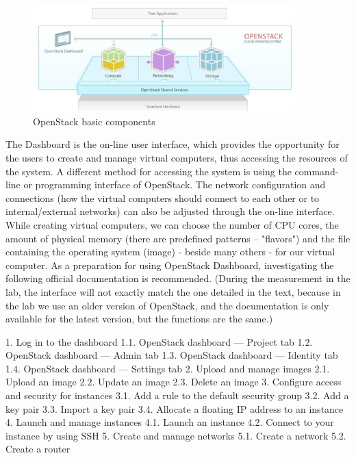 \documentclass[a4paper]{article}
\begin{document}
\begin{figure}[H]
    \centering
    \includegraphics[width=0.9\textwidth]{figures/components.png}
    \caption{OpenStack basic components}
    \label{fig:oscomponents}
\end{figure}

The Dashboard is the on-line user interface, which provides the opportunity for the users to create and manage virtual computers, thus accessing the resources of the system. A different method for accessing the system is using the command-line or programming interface of OpenStack. The network configuration and connections (how the virtual computers should connect to each other or to internal/external networks) can also be adjusted through the on-line interface. While creating virtual computers, we can choose the number of CPU cores, the amount of physical memory (there are predefined patterns – "flavors") and the file containing the operating system (image) - beside many others - for our virtual computer.
As a preparation for using OpenStack Dashboard, investigating the following official documentation is recommended. (During the measurement in the lab, the interface will not exactly match the one detailed in the text, because in the lab we use an older version of OpenStack, and the documentation is only available for the latest version, but the functions are the same.)

1.  Log in to the dashboard
1.1.  OpenStack dashboard — Project tab
1.2.  OpenStack dashboard — Admin tab
1.3.  OpenStack dashboard — Identity tab
1.4.  OpenStack dashboard — Settings tab
2.  Upload and manage images
2.1.  Upload an image
2.2.  Update an image
2.3.  Delete an image
3.  Configure access and security for instances
3.1.  Add a rule to the default security group
3.2.  Add a key pair
3.3.  Import a key pair
3.4.  Allocate a floating IP address to an instance
4.  Launch and manage instances
4.1.  Launch an instance
4.2.  Connect to your instance by using SSH
5.  Create and manage networks
5.1.  Create a network
5.2.  Create a router
\end{document}
